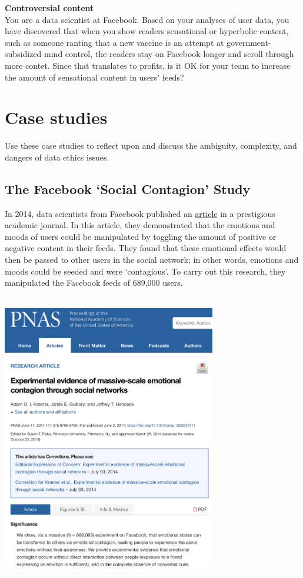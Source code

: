 \documentclass[
]{book}
\begin{document}
\textbf{Controversial content}\\
You are a data scientist at Facebook. Based on your analyses of user data, you have discovered that when you show readers sensational or hyperbolic content, such as someone ranting that a new vaccine is an attempt at government-subsidized mind control, the readers stay on Facebook longer and scroll through more contet. Since that translates to profits, is it OK for your team to increase the amount of sensational content in users' feeds?

\hypertarget{case-studies}{%
\section*{Case studies}\label{case-studies}}

Use these case studies to reflect upon and discuss the ambiguity, complexity, and dangers of data ethics issues.

\hypertarget{the-facebook-social-contagion-study}{%
\subsection*{The Facebook `Social Contagion' Study}\label{the-facebook-social-contagion-study}}

In 2014, data scientists from Facebook published an \href{https://www.pnas.org/content/111/24/8788}{article} in a prestigious academic journal. In this article, they demonstrated that the emotions and moods of users could be manipulated by toggling the amount of positive or negative content in their feeds. They found that these emotional effects would then be passed to other users in the social network; in other words, emotions and moods could be seeded and were `contagious'. To carry out this research, they manipulated the Facebook feeds of 689,000 users.

~\\

\includegraphics[width=0.7\textwidth,height=\textheight]{img/ethics-fb.png}
\end{document}
